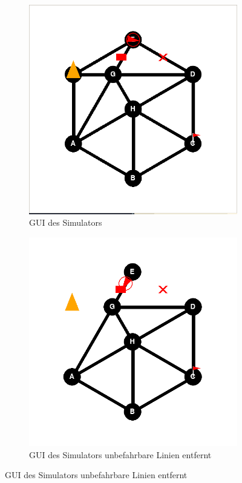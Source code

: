 \begin{figure}[H]
\begin{subfigure}{0.49\textwidth}
\includegraphics[width=\textwidth]{assets/informatik-prototyp/simulator/sim-ui.png}
\caption{GUI des Simulators}
\label{fig:sim-gui}
\end{subfigure}
\begin{subfigure}{0.49\textwidth}
\includegraphics[width=\textwidth]{assets/informatik-prototyp/simulator/removed-lines-sim.png}
\caption{GUI des Simulators unbefahrbare Linien entfernt}
\label{fig:sim-gui-removed-lines}
\end{subfigure}
\end{figure}